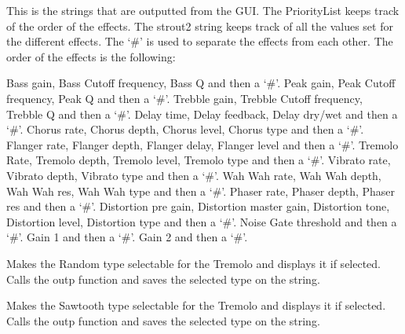 \documentclass[letterpaper,10pt,english]{sphinxmanual}
\begin{document}
\begin{fulllineitems}
\label{Code:GUI.strout2}
This is the strings that are outputted from the GUI. The PriorityList keeps track of the order of the effects. The strout2 string
keeps track of all the values set for the different effects. The `\#' is used to separate the effects from each other.
The order of the effects is the following:

Bass gain, Bass Cutoff frequency, Bass Q and then a `\#'.
Peak gain, Peak Cutoff frequency, Peak Q and then a `\#'.
Trebble gain, Trebble   Cutoff frequency, Trebble Q and then a `\#'.
Delay time, Delay feedback, Delay dry/wet and then a `\#'.
Chorus rate, Chorus depth, Chorus level, Chorus type and then a `\#'.
Flanger rate, Flanger depth, Flanger delay, Flanger level and then a `\#'.
Tremolo Rate, Tremolo depth, Tremolo level, Tremolo type and then a `\#'.
Vibrato rate, Vibrato depth, Vibrato type and then a `\#'.
Wah Wah rate, Wah Wah depth, Wah Wah res, Wah Wah type and then a `\#'.
Phaser rate, Phaser depth, Phaser res and then a `\#'.
Distortion pre gain, Distortion master gain, Distortion tone, Distortion level, Distortion type and then a `\#'.
Noise Gate threshold and then a `\#'.
Gain 1 and then a `\#'.
Gain 2 and then a `\#'.

\end{fulllineitems}


\begin{fulllineitems}
\label{Code:GUI.tremoloRANDOM_val}
Makes the Random type selectable for the Tremolo and displays it if selected. Calls the outp function and saves the selected 
type on the string.

\end{fulllineitems}


\begin{fulllineitems}
\label{Code:GUI.tremoloSAWTOOTH_val}
Makes the Sawtooth type selectable for the Tremolo and displays it if selected. Calls the outp function and saves the selected 
type on the string.

\end{fulllineitems}
\end{document}
